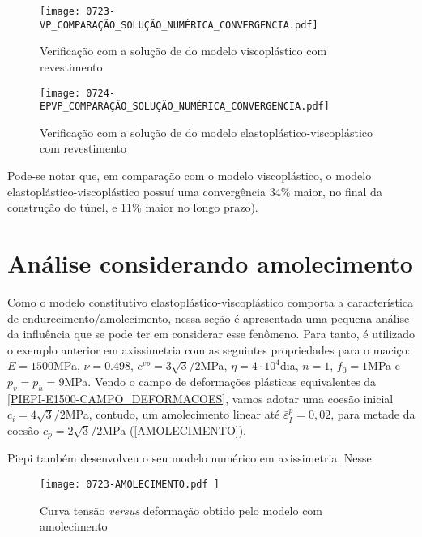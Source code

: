 \begin{figure}[H]
	\begin{center}
		\texttt{[image: 0723-VP\_COMPARAÇÃO\_SOLUÇÃO\_NUMÉRICA\_CONVERGENCIA.pdf]}
	\end{center}
	\caption{\label{VP_COMPARAÇÃO_SOLUÇÃO_NUMÉRICA_CONVERGENCIA}Verificação com a solução de  do modelo viscoplástico com revestimento}
\end{figure}

\begin{figure}[H]
	\begin{center}
		\texttt{[image: 0724-EPVP\_COMPARAÇÃO\_SOLUÇÃO\_NUMÉRICA\_CONVERGENCIA.pdf]}
	\end{center}
	\caption{\label{EPVP_COMPARAÇÃO_SOLUÇÃO_NUMÉRICA_CONVERGENCIA}Verificação com a solução de  do modelo elastoplástico-viscoplástico com revestimento}
\end{figure}

Pode-se notar que, em comparação com o modelo viscoplástico, o modelo elastoplástico-viscoplástico possuí uma convergência 34\% maior, no final da construção do túnel, e 11\% maior no longo prazo).

\section{Análise considerando amolecimento}

Como o modelo constitutivo elastoplástico-viscoplástico comporta a característica de endurecimento/amolecimento, nessa seção é apresentada uma pequena análise da influência que se pode ter em considerar esse fenômeno. Para tanto, é utilizado o exemplo anterior em axissimetria com as seguintes propriedades para o maciço: $E=1500$MPa, $\nu=0.498$, $c^{vp}=3\sqrt{3}/2$MPa, $\eta = 4 \cdot 10^4$dia, $n=1$, $f_0=1$MPa e $p_v=p_h=9$MPa. Vendo o campo de deformações plásticas equivalentes da \autoref{PIEPI-E1500-CAMPO_DEFORMACOES}, vamos adotar uma coesão inicial $c_i=4\sqrt{3}/2$MPa, contudo, um amolecimento linear até $\bar \varepsilon^p_{I} = 0,02$, para metade da coesão $c_p=2\sqrt{3}/2$MPa (\autoref{AMOLECIMENTO}).

Piepi também desenvolveu o seu modelo numérico em axissimetria. Nesse

\begin{figure}[H]
	\begin{center}
		\texttt{[image: 0723-AMOLECIMENTO.pdf
		]}
	\end{center}
	\caption{\label{AMOLECIMENTO}Curva tensão \textit{versus} deformação obtido pelo modelo com amolecimento}
\end{figure}

